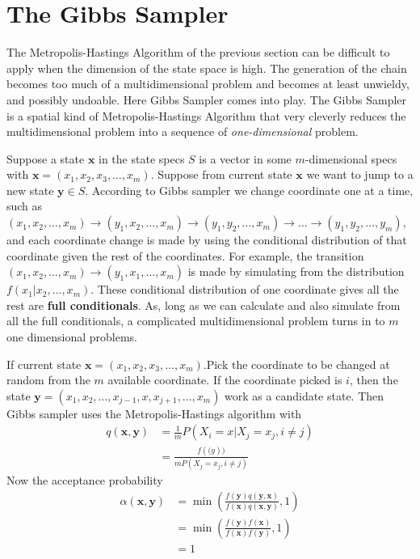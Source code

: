 \section{The Gibbs Sampler}

The Metropolis-Hastings Algorithm of the previous section can be difficult to apply when the dimension of the state space is high. 
The generation of the chain becomes too much of a multidimensional problem and becomes at least unwieldy, and possibly undoable.
Here Gibbs Sampler comes into play. The Gibbs Sampler is a spatial kind of Metropolis-Hastings Algorithm that very cleverly reduces the multidimensional problem into a sequence of \textit{one-dimensional} problem. 

Suppose a state $ \mathbf{x} $ in the state specs $ S $ is a vector in some $ m $-dimensional specs with $ \mathbf{x} = (x_1,x_2,x_3,\ldots,x_m) $. Suppose from current state $ \mathbf{x} $ we want to jump to a new state $ \mathbf{y}\in S $. According to Gibbs sampler we change coordinate one at a time,
such as $ (x_1,x_2,\ldots,x_m) \to (y_1,x_2,\ldots,x_m) \to (y_1,y_2,\ldots,x_m) \to \ldots \to (y_1,y_2,\ldots,y_m)  $, and each coordinate change is made by using the conditional distribution of that coordinate given the rest of the coordinates. 
For example, the transition $ (x_1,x_2,\ldots,x_m) \to (y_1,x_1,\ldots,x_m) $ is made by simulating from the distribution $ f(x_1|x_2,\ldots,x_m) $.
These conditional distribution of one coordinate gives all the rest are \textbf{full conditionals}. As, long as we can calculate and also simulate from all the full conditionals, a complicated multidimensional problem turns in to $ m $ one dimensional problems.

If current state $ \mathbf{x} = (x_1,x_2,x_3,\ldots,x_m)  $.Pick the coordinate to be changed at random from the $ m $ available coordinate. If the coordinate picked is $ i $, then the state $ \mathbf{y} = (x_1,x_2, \ldots , x_{j-1}, x , x_{j+1}, \ldots , x_m) $ work as a candidate state.
Then Gibbs sampler uses the Metropolis-Hastings algorithm with
\begin{align*}
    q(\mathbf{x},\mathbf{y}) &= \frac{1}{m} P( X_i = x | X_j = x_j, i\neq j )\\ 
                             &= \frac{f(\mathbf(y))}{mP(X_j = x_j, i \neq j)}
\end{align*}
Now the acceptance probability
\begin{align*}
    \alpha(\mathbf{x},\mathbf{y}) &= \min \left( \frac{f(\mathbf{y})q(\mathbf{y},\mathbf{x})}{f(\mathbf{x})q(\mathbf{x},\mathbf{y})} , 1 \right) \\ 
                                  &= \min \left(  \frac{ f(\mathbf{y})f(\mathbf{x}) }{  f(\mathbf{x})f(\mathbf{y})  } , 1  \right) \\ 
                                  &= 1
\end{align*}

